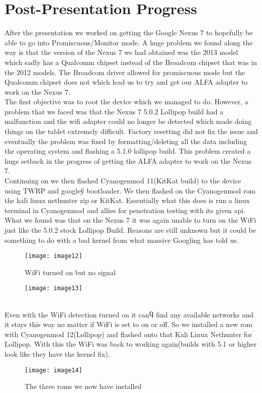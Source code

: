 \documentclass[12pt, titlepage]{article}
\begin{document}
\section{Post-Presentation Progress}
After the presentation we worked on getting the Google Nexus 7 to hopefully be able to go into Promiscuous/Monitor mode.  A huge problem we found along the way is that the version of the Nexus 7 we had obtained was the 2013 model which sadly has a Qualcomm chipset instead of the Broadcom chipset that was in the 2012 models.  The Broadcom driver allowed for promiscuous mode but the Qualcomm chipset does not which lead us to try and get our ALFA adapter to work on the Nexus 7.
\\
The first objective was to root the device which we managed to do.  However, a problem that we faced was that the Nexus 7 5.0.2 Lollipop build had a malfunction and the wifi adapter could no longer be detected which made doing things on the tablet extremely difficult.  Factory resetting did not fix the issue and eventually the problem was fixed by formatting/deleting all the data including the operating system and flashing a 5.1.0 lollipop build.  This problem created a huge setback in the progress of getting the ALFA adapter to work on the Nexus 7.
\\
Continuing on we then flashed Cyanogenmod 11(KitKat build) to the device using TWRP and googleӳ bootloader.  We then flashed on the Cyanogenmod rom the kali linux nethunter zip or KitKat.  Essentially what this does is run a linux terminal in Cyanogenmod and allies for penetration testing with its given api.  What we found was that on the Nexus 7 it was again unable to turn on the WiFi just like the 5.0.2 stock Lollipop Build.  Reasons are still unknown but it could be something to do with a bad kernel from what massive Googling has told us.  
\\
\begin{figure}[h]
\centering
\texttt{[image: image12]}
\caption{WiFi turned on but no signal}
\end{figure}

\begin{figure}[h]
\centering
\texttt{[image: image13]}
\end{figure}
\\

Even with the WiFi detection turned on it canӴ find any available networks and it stays this way no matter if WiFi is set to on or off.  So we installed a new rom with Cyanogenmod 12(Lollipop) and flashed onto that Kali Linux Nethunter for Lollipop.  With this the WiFi was back to working again(builds with 5.1 or higher look like they have the kernel fix).  
\\
\begin{figure}[h]
\centering
\texttt{[image: image14]}
\caption{The three roms we now have installed}
\end{figure}
\end{document}
